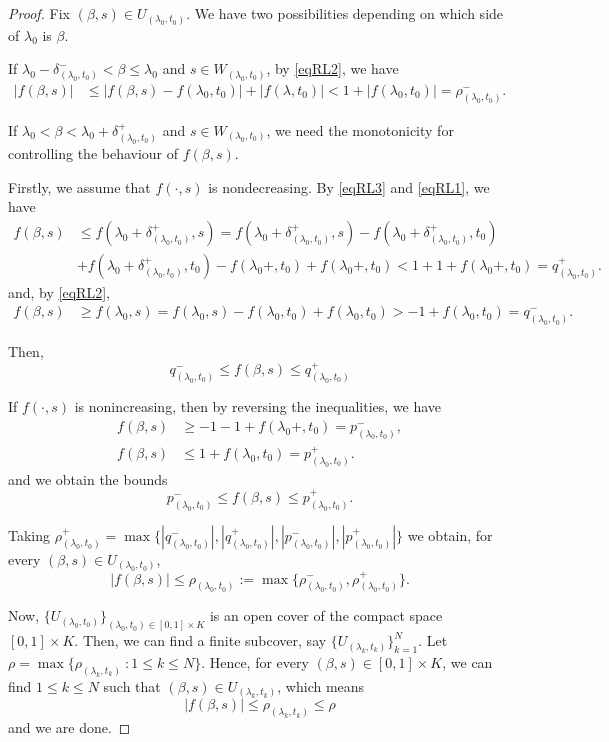 \documentclass{amsart}
\begin{document}
\begin{proof}
 Fix $(\beta,s)\in U_{(\lambda_0,t_0)}$. We have two possibilities
depending on which side of $\lambda_0$ is $\beta$.

\medskip
If $\lambda_0-\delta_{(\lambda_0,t_0)}^-<\beta\leq \lambda_0$ and $s\in W_{(\lambda_0,t_0)}$, by \eqref{eqRL2}, we have
\begin{align*}
|f(\beta,s)| &\leq |f(\beta,s)-f(\lambda_0,t_0)|+|f(\lambda,t_0)|<1
+|f(\lambda_0,t_0)|=\rho_{(\lambda_0,t_0)}^-.
\end{align*}

If  $\lambda_0<\beta<\lambda_0 +\delta_{(\lambda_0,t_0)}^+$ and $s\in W_{(\lambda_0,t_0)}$,  we  need the monotonicity for controlling the behaviour of $f(\beta,s)$.

Firstly,  we assume that $f(\cdot,s)$ is nondecreasing.
By \eqref{eqRL3} and \eqref{eqRL1}, we have
\begin{align*}
f(\beta,s) &\leq f(\lambda_0 +\delta_{(\lambda_0,t_0)}^+,s)=f(\lambda_0 +\delta_{(\lambda_0,t_0)}^+,s)-f(\lambda_0 +\delta_{(\lambda_0,t_0)}^+,t_0)\\
&+ f(\lambda_0 +\delta_{(\lambda_0,t_0)}^+,t_0 )-f(\lambda_0+,t_0)+f(\lambda_0+,t_0)<1+1+f(\lambda_0+,t_0)=q_{(\lambda_0,t_0)}^+.
\end{align*}
and, by \eqref{eqRL2},
\begin{align*}
f(\beta,s) &\geq f(\lambda_0,s)=f(\lambda_0,s)-f(\lambda_0,t_0)+ f(\lambda_0,t_0 )>-1+f(\lambda_0,t_0)=q_{(\lambda_0,t_0)}^-.
\end{align*}

Then,
$$q_{(\lambda_0,t_0)}^-\leq f(\beta,s)\leq q_{(\lambda_0,t_0)}^+$$

If $f(\cdot,s)$ is nonincreasing, then by reversing the inequalities, we have
\begin{align*}
f(\beta,s) &\geq -1-1+f(\lambda_0+,t_0)=p_{(\lambda_0,t_0)}^-,\\
f(\beta,s) &\leq 1+f(\lambda_0,t_0)=p_{(\lambda_0,t_0)}^+.
\end{align*}
and we obtain the bounds
$$p_{(\lambda_0,t_0)}^-\leq f(\beta,s)\leq p_{(\lambda_0,t_0)}^+.$$

Taking $\rho_{(\lambda_0,t_0)}^+=\max\{|q_{(\lambda_0,t_0)}^-|, |q_{(\lambda_0,t_0)}^+|,|p_{(\lambda_0,t_0)}^-|,|p_{(\lambda_0,t_0)}^+|\}$
we obtain, for every $(\beta,s) \in U_{(\lambda_0,t_0)}$,
$$|f(\beta,s)|\leq\rho_{(\lambda_0,t_0)}:=\max\{\rho_{(\lambda_0,t_0)}^-,\rho_{(\lambda_0,t_0)}^+\}.$$

Now,
 $\{  U_{(\lambda_0,t_0)}\}_{(\lambda_0,t_0)\in[0,1]\times K}$ is an open cover of the compact space $[0,1]\times K$. Then, we can find a finite subcover, say
 $\{  U_{(\lambda_k,t_k)}\}_{k=1}^{N}$.
 Let $\rho=\max\{ \rho_{(\lambda_k,t_k)}\ : 1\leq k\leq N\}$. Hence,
 for every $(\beta,s)\in [0,1]\times K$, we can find $1\leq k\leq N$ such that
 $(\beta,s)\in U_{(\lambda_k,t_k)}$, which means
 $$|f(\beta,s)|\leq\rho_{(\lambda_k,t_k)}\leq \rho$$
 and we are done.
\end{proof}
\end{document}
